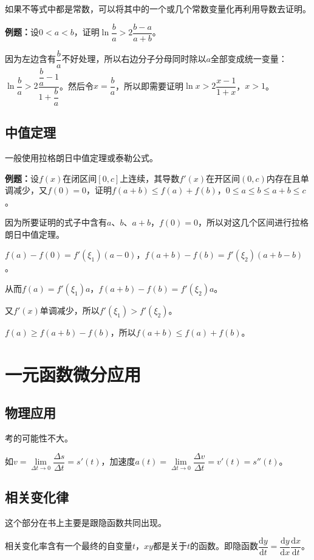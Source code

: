 \documentclass[UTF8, 12pt]{ctexart}
\begin{document}
如果不等式中都是常数，可以将其中的一个或几个常数变量化再利用导数去证明。

\textbf{例题：}设$0<a<b$，证明$\ln\dfrac{b}{a}>2\dfrac{b-a}{a+b}$。

因为左边含有$\dfrac{b}{a}$不好处理，所以右边分子分母同时除以$a$全部变成统一变量：$\ln\dfrac{b}{a}>2\dfrac{\dfrac{b}{a}-1}{1+\dfrac{b}{a}}$。然后令$x=\dfrac{b}{a}$，所以即需要证明$\ln x>2\dfrac{x-1}{1+x}$，$x>1$。

\subsection{中值定理}

一般使用拉格朗日中值定理或泰勒公式。

\textbf{例题：}设$f(x)$在闭区间$[0,c]$上连续，其导数$f'(x)$在开区间$(0,c)$内存在且单调减少，又$f(0)=0$，证明$f(a+b)\leqslant f(a)+f(b)$，$0\leqslant a\leqslant b\leqslant a+b\leqslant c$。

因为所要证明的式子中含有$a$、$b$、$a+b$，$f(0)=0$，所以对这几个区间进行拉格朗日中值定理。

$f(a)-f(0)=f'(\xi_1)(a-0)$，$f(a+b)-f(b)=f'(\xi_2)(a+b-b)$。

从而$f(a)=f'(\xi_1)a$，$f(a+b)-f(b)=f'(\xi_2)a$。

又$f'(x)$单调减少，所以$f'(\xi_1)>f'(\xi_2)$。

$f(a)\geqslant f(a+b)-f(b)$，所以$f(a+b)\leqslant f(a)+f(b)$。

\section{一元函数微分应用}

\subsection{物理应用}

考的可能性不大。

如$v=\lim\limits_{\Delta t\to0}\dfrac{\Delta s}{\Delta t}=s'(t)$，加速度$a(t)=\lim\limits_{\Delta t\to0}\dfrac{\Delta v}{\Delta t}=v'(t)=s''(t)$。

\subsection{相关变化律}

这个部分在书上主要是跟隐函数共同出现。

相关变化率含有一个最终的自变量$t$，$xy$都是关于$t$的函数。即隐函数$\dfrac{\textrm{d}y}{\textrm{d}t}=\dfrac{\textrm{d}y}{\textrm{d}x}\dfrac{\textrm{d}x}{\textrm{d}t}$。
\end{document}
